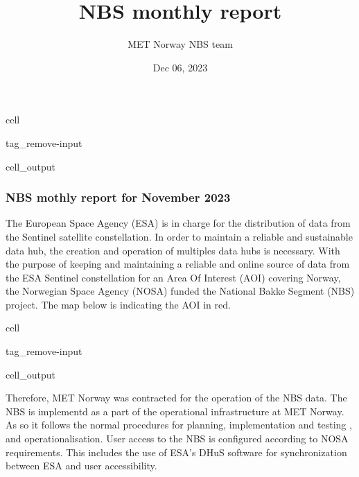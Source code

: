 \documentclass[letterpaper,10pt,english]{jupyterBook}
\title{NBS monthly report}
\date{Dec 06, 2023}
\author{MET Norway \sphinxhyphen{} NBS team}
\begin{document}
\pagestyle{empty}
\sphinxmaketitle
\pagestyle{plain}
\sphinxtableofcontents
\pagestyle{normal}
\label{\detokenize{intro::doc}}
\begin{sphinxuseclass}{cell}
\begin{sphinxuseclass}{tag_remove-input}\begin{sphinxVerbatimOutput}

\begin{sphinxuseclass}{cell_output}\subsubsection*{NBS mothly report for November 2023}

\end{sphinxuseclass}\end{sphinxVerbatimOutput}

\end{sphinxuseclass}
\end{sphinxuseclass}


\begin{DUlineblock}{0em}
\item[] 
\end{DUlineblock}

\sphinxAtStartPar
The European Space Agency (ESA) is in charge for the distribution of data from the Sentinel satellite constellation. In order to maintain a reliable and sustainable data hub, the creation and operation of multiples data hubs is necessary. With the purpose of keeping and maintaining a reliable and online source of data from the ESA Sentinel constellation for an Area Of Interest (AOI) covering Norway, the Norwegian Space Agency (NOSA) funded the National Bakke Segment (NBS) project. The map below is indicating the AOI in red.

\begin{sphinxuseclass}{cell}
\begin{sphinxuseclass}{tag_remove-input}\begin{sphinxVerbatimOutput}

\begin{sphinxuseclass}{cell_output}
\noindent{}

\end{sphinxuseclass}\end{sphinxVerbatimOutput}

\end{sphinxuseclass}
\end{sphinxuseclass}
\sphinxAtStartPar
Therefore, MET Norway was contracted for the operation of the NBS data. The NBS is implementd as a part of the operational infrastructure at MET Norway. As so it follows the normal procedures for planning, implementation and testing , and operationalisation. User access to the NBS is configured according to NOSA requirements. This includes the use of ESA’s DHuS software for synchronization between ESA and user accessibility.
\end{document}
